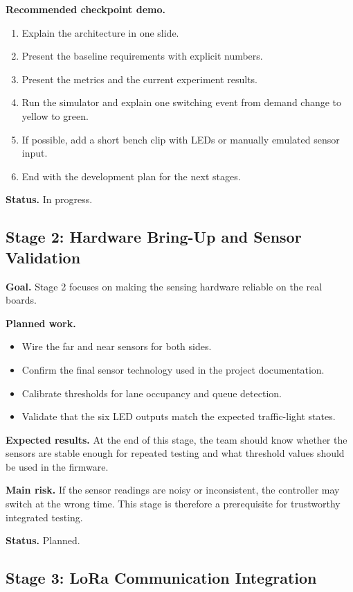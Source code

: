 \documentclass[11pt,a4paper]{article}
\begin{document}
\textbf{Recommended checkpoint demo.}

\begin{enumerate}
    \item Explain the architecture in one slide.
    \item Present the baseline requirements with explicit numbers.
    \item Present the metrics and the current experiment results.
    \item Run the simulator and explain one switching event from demand change to yellow to green.
    \item If possible, add a short bench clip with LEDs or manually emulated sensor input.
    \item End with the development plan for the next stages.
\end{enumerate}

\textbf{Status.} In progress.

\subsection{Stage 2: Hardware Bring-Up and Sensor Validation}

\textbf{Goal.} Stage 2 focuses on making the sensing hardware reliable on the real boards.

\textbf{Planned work.}

\begin{itemize}
    \item Wire the far and near sensors for both sides.
    \item Confirm the final sensor technology used in the project documentation.
    \item Calibrate thresholds for lane occupancy and queue detection.
    \item Validate that the six LED outputs match the expected traffic-light states.
\end{itemize}

\textbf{Expected results.} At the end of this stage, the team should know whether the sensors are stable enough for repeated testing and what threshold values should be used in the firmware.

\textbf{Main risk.} If the sensor readings are noisy or inconsistent, the controller may switch at the wrong time. This stage is therefore a prerequisite for trustworthy integrated testing.

\textbf{Status.} Planned.

\subsection{Stage 3: LoRa Communication Integration}
\end{document}
